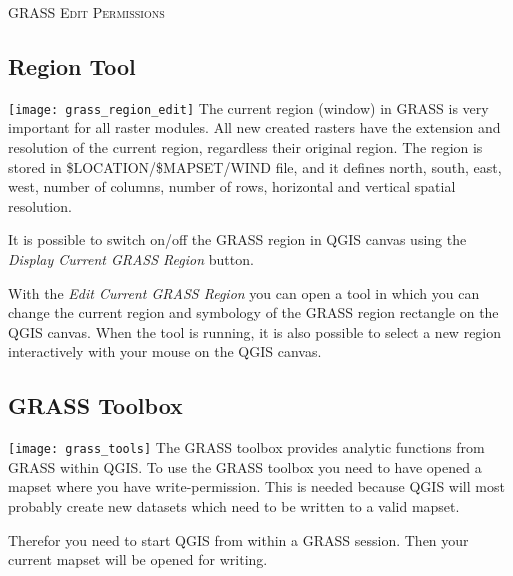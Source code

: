 \begin{Tip}\caption{\textsc{GRASS Edit Permissions}}
\end{Tip} 

\subsection{Region Tool}

\texttt{[image: grass\_region\_edit]} The current region (window) in GRASS is very important for all 
raster modules. All new created rasters have the extension and resolution
of the current region, regardless their original region. 
The region is stored in \$LOCATION/\$MAPSET/WIND file, and it defines
north, south, east, west, number of columns, number of rows, 
horizontal and vertical spatial resolution.

It is possible to switch on/off the GRASS region in QGIS canvas
using the \textsl{Display Current GRASS Region}
button. 

With the \textsl{Edit Current GRASS Region} you can open a tool 
in which you can change the current region and symbology
of the GRASS region rectangle on the QGIS canvas. When the tool is running,
it is also possible to select a new region interactively with your mouse
on the QGIS canvas.


\subsection{GRASS Toolbox}

\texttt{[image: grass\_tools]} The GRASS toolbox provides analytic functions from GRASS within QGIS. To
use the GRASS toolbox you need to have opened a mapset where you have
write-permission. This is needed because QGIS will most probably create
new datasets which need to be written to a valid mapset.

Therefor you need to start QGIS from within a GRASS session. Then your 
current mapset will be opened for writing.


